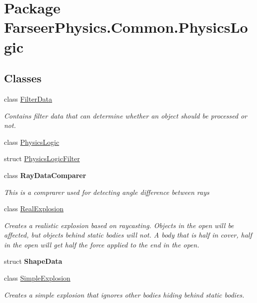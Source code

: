 \hypertarget{namespace_farseer_physics_1_1_common_1_1_physics_logic}{\section{Package Farseer\+Physics.\+Common.\+Physics\+Logic}
\label{namespace_farseer_physics_1_1_common_1_1_physics_logic}
}
\subsection*{Classes}
\begin{DoxyCompactItemize}
\item 
class \hyperlink{class_farseer_physics_1_1_common_1_1_physics_logic_1_1_filter_data}{Filter\+Data}
\begin{DoxyCompactList}\small\item\em Contains filter data that can determine whether an object should be processed or not. \end{DoxyCompactList}\item 
class \hyperlink{class_farseer_physics_1_1_common_1_1_physics_logic_1_1_physics_logic}{Physics\+Logic}
\item 
struct \hyperlink{struct_farseer_physics_1_1_common_1_1_physics_logic_1_1_physics_logic_filter}{Physics\+Logic\+Filter}
\item 
class {\bfseries Ray\+Data\+Comparer}
\begin{DoxyCompactList}\small\item\em This is a comprarer used for detecting angle difference between rays \end{DoxyCompactList}\item 
class \hyperlink{class_farseer_physics_1_1_common_1_1_physics_logic_1_1_real_explosion}{Real\+Explosion}
\begin{DoxyCompactList}\small\item\em Creates a realistic explosion based on raycasting. Objects in the open will be affected, but objects behind static bodies will not. A body that is half in cover, half in the open will get half the force applied to the end in the open. \end{DoxyCompactList}\item 
struct {\bfseries Shape\+Data}
\item 
class \hyperlink{class_farseer_physics_1_1_common_1_1_physics_logic_1_1_simple_explosion}{Simple\+Explosion}
\begin{DoxyCompactList}\small\item\em Creates a simple explosion that ignores other bodies hiding behind static bodies. \end{DoxyCompactList}\end{DoxyCompactItemize}
